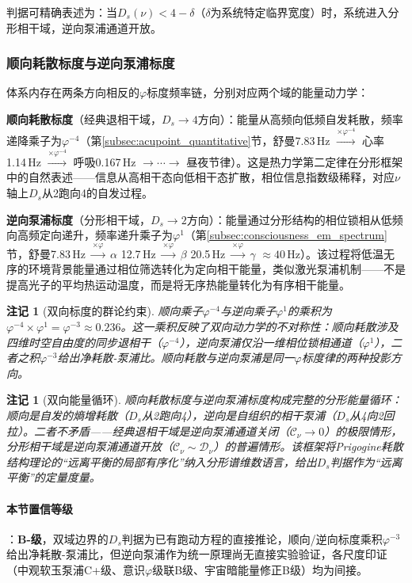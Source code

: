 \documentclass[12pt,a4paper,twocolumn]{article}
\renewcommand{\phi}{\varphi}
\newtheorem{remark}[theorem]{注记}
\begin{document}
判据可精确表述为：当$D_s(\nu) < 4 - \delta$（$\delta$为系统特定临界宽度）时，系统进入分形相干域，逆向泵浦通道开放。

\subsubsection{顺向耗散标度与逆向泵浦标度}

体系内存在两条方向相反的$\phi$标度频率链，分别对应两个域的能量动力学：

\textbf{顺向耗散标度}（经典退相干域，$D_s\to 4$方向）：能量从高频向低频自发耗散，频率递降乘子为$\phi^{-4}$（第\ref{subsec:acupoint_quantitative}节，舒曼7.83\,Hz $\xrightarrow{\times\phi^{-4}}$ 心率1.14\,Hz $\xrightarrow{\times\phi^{-4}}$ 呼吸0.167\,Hz $\to \cdots \to$ 昼夜节律）。这是热力学第二定律在分形框架中的自然表述——信息从高相干态向低相干态扩散，相位信息指数级稀释，对应$\nu$轴上$D_s$从2跑向4的自发过程。

\textbf{逆向泵浦标度}（分形相干域，$D_s\to 2$方向）：能量通过分形结构的相位锁相从低频向高频定向递升，频率递升乘子为$\phi^{1}$（第\ref{subsec:consciousness_em_spectrum}节，舒曼7.83\,Hz $\xrightarrow{\times\phi}$ $\alpha$ 12.7\,Hz $\xrightarrow{\times\phi}$ $\beta$ 20.5\,Hz $\xrightarrow{\times\phi}$ $\gamma$ $\approx 40$\,Hz）。该过程将低温无序的环境背景能量通过相位筛选转化为定向相干能量，类似激光泵浦机制——不是提高光子的平均热运动温度，而是将无序热能量转化为有序相干能量。

\begin{remark}[双向标度的群论约束]
顺向乘子$\phi^{-4}$与逆向乘子$\phi^{1}$的乘积为$\phi^{-4} \times \phi^{1} = \phi^{-3} \approx 0.236$。这一乘积反映了双向动力学的不对称性：顺向耗散涉及四维时空自由度的同步退相干（$\phi^{-4}$），逆向泵浦仅沿一维相位锁相通道（$\phi^{1}$），二者之积$\phi^{-3}$给出净耗散-泵浦比。顺向耗散与逆向泵浦是同一$\phi$标度律的两种投影方向。
\end{remark}

\begin{remark}[双向能量循环]
顺向耗散标度与逆向泵浦标度构成完整的分形能量循环：顺向是自发的熵增耗散（$D_s$从2跑向4），逆向是自组织的相干泵浦（$D_s$从4向2回拉）。二者不矛盾——经典退相干域是逆向泵浦通道关闭（$\mathcal{C}_\nu \to 0$）的极限情形，分形相干域是逆向泵浦通道开放（$\mathcal{C}_\nu \sim \mathcal{D}_\nu$）的普遍情形。该框架将Prigogine耗散结构理论的``远离平衡的局部有序化''纳入分形谱维数语言，给出$D_s$判据作为``远离平衡''的定量度量。
\end{remark}

\paragraph{本节置信等级}：\textbf{B-级}，双域边界的$D_s$判据为已有跑动方程的直接推论，顺向/逆向标度乘积$\phi^{-3}$给出净耗散-泵浦比，但逆向泵浦作为统一原理尚无直接实验验证，各尺度印证（中观软玉泵浦C+级、意识$\phi$级联B级、宇宙暗能量修正B级）均为间接。
\end{document}
